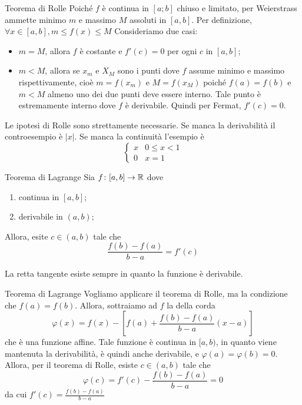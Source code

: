 \documentclass[a4paper]{article}
\begin{document}
\begin{snippetproof}{Teorema di Rolle}
    Poiché \(f\) è continua in \([a;b]\) chiuso e limitato, per Weierstrass ammette
    minimo \(m\) e massimo \(M\) assoluti in \([a,b]\).
    Per definizione, \(\forall x\in [a,b], m \leq f(x) \leq M\)
    Consideriamo due casi:
    \begin{itemize}
        \item \(m=M\), allora \(f\) è costante e \(f'(c) = 0\) per ogni \(c\) in \([a,b]\);
        \item \(m<M\), allora se \(x_m\) e \(X_M\) sono i punti dove \(f\)
        assume minimo e massimo rispettivamente, cioè \(m=f(x_m)\) e \(M=f(x_M)\)
        poiché \(f(a) = f(b)\) e \(m<M\) almeno uno dei due punti
        deve essere interno. Tale punto è estremamente interno dove \(f\) è derivabile.
        Quindi per Fermat, \(f'(c) = 0\).
    \end{itemize}
\end{snippetproof}

Le ipotesi di Rolle sono strettamente necessarie. Se manca la derivabilità
il controesempio è \(|x|\). Se manca la continuità l'esempio è
\[
    \begin{cases}
        x & 0 \leq x < 1 \\
        0 & x = 1
    \end{cases}
\]

\begin{radioactive}
\begin{snippettheorem}{Teorema di Lagrange}
    Sia \(f \colon [a,b] \to \mathbb{R}\) dove
    \begin{enumerate}
        \item continua in \([a,b]\);
        \item derivabile in \((a,b)\);
    \end{enumerate}
    Allora, esite \(c\in(a,b)\) tale che
    \[
        \frac{f(b) - f(a)}{b-a} = f'(c)
    \]
\end{snippettheorem}

La retta tangente esiste sempre in quanto la funzione è derivabile.

\begin{snippetproof}{Teorema di Lagrange}
    Vogliamo applicare il teorema di Rolle, ma la condizione che \(f(a)=f(b)\).
    Allora, sottraiamo ad \(f\) la della corda
    \[
        \varphi(x) = f(x) - \left[
            f(a) + \frac{f(b) - f(a)}{b-a}(x-a)
        \right]
    \]
    che è una funzione affine.
    Tale funzione è continua in \([a,b)\), in quanto viene mantenuta la derivabilità,
    è quindi anche derivabile, e \(\varphi(a) = \varphi(b) = 0\).
    Allora, per il teorema di Rolle, esiste \(c\in (a,b)\)
    tale che
    \[
        \varphi(c) = f'(c) - \frac{f(b) - f(a)}{b-a} = 0
    \]
    da cui \(f'(c) = \frac{f(b) - f(a)}{b-a}\)
\end{snippetproof}
\end{radioactive}
\end{document}
